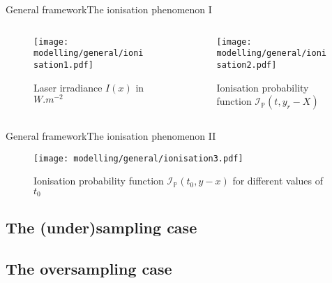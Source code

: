 \begin{frame}{General framework}{The ionisation phenomenon I}
\begin{columns}[c]
	\begin{column}{5.75cm}
			\begin{figure}[H]
		\label{mapping1}\caption{Laser irradiance $I(x)$ in $W.m^{-2}$}
		\centering
    	\texttt{[image: modelling/general/ionisation1.pdf]}
	\end{figure}
	\end{column}
	\begin{column}{5.75cm}
			\begin{figure}[H]
		\label{mapping1}\caption{Ionisation probability function $\mathcal{I}_{\mathds{P}}(t, y_{r} - X)$}
		\centering
    	\texttt{[image: modelling/general/ionisation2.pdf]}
	\end{figure}
	\end{column}
\end{columns}
\end{frame}

\begin{frame}{General framework}{The ionisation phenomenon II}
\begin{figure}[H]
	\label{mapping1}\caption{Ionisation probability function $\mathcal{I}_{\mathds{P}}(t_{0}, y - x)$ for different values of $t_{0}$}
	\centering
    \texttt{[image: modelling/general/ionisation3.pdf]}
\end{figure}
\end{frame}

\subsection{The (under)sampling case}


\subsection{The oversampling case}

%
%
